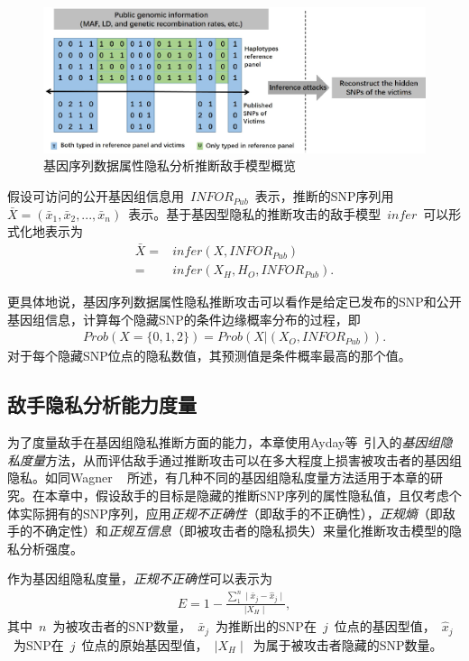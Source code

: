 \begin{figure}[htbp]
	\centering
	\includegraphics[width = 0.95\linewidth]{./figures/Fig2-adversary-model.eps}
	\caption{基因序列数据属性隐私分析推断敌手模型概览}
	\label{fig:adversary-model}
\end{figure}

假设可访问的公开基因组信息用~${INFOR}_{Pub}$~表示，推断的SNP序列用~$\bar{X}=(\bar{x}_1, \bar{x}_2,...,\bar{x}_n)$~表示。基于基因型隐私的推断攻击的敌手模型~$infer$~可以形式化地表示为
\begin{align}\label{eq:adversary-model}
\bar{X} =& infer(X,{INFOR}_{Pub})  \nonumber \\
= & infer(X_H,H_O,{INFOR}_{Pub}).
\end{align}

更具体地说，基因序列数据属性隐私推断攻击可以看作是给定已发布的SNP和公开基因组信息，计算每个隐藏SNP的条件边缘概率分布的过程，即
\begin{align}\label{eq:adversary-model-prob}
Prob(X=\{0,1,2\})=Prob(X|(X_O,{INFOR}_{Pub})).
\end{align}
对于每个隐藏SNP位点的隐私数值，其预测值是条件概率最高的那个值。

\subsection{敌手隐私分析能力度量}


为了度量敌手在基因组隐私推断方面的能力，本章使用Ayday等~\cite{ayday2013personal}引入的\textit{基因组隐私度量}方法，从而评估敌手通过推断攻击可以在多大程度上损害被攻击者的基因组隐私。如同Wagner
~\cite{wagner2017evaluating}
所述，有几种不同的基因组隐私度量方法适用于本章的研究。在本章中，假设敌手的目标是隐藏的推断SNP序列的属性隐私值，且仅考虑个体实际拥有的SNP序列，应用\textit{正规不正确性}（即敌手的不正确性），\textit{正规熵}（即敌手的不确定性）和\textit{正规互信息}（即被攻击者的隐私损失）来量化推断攻击模型的隐私分析强度。

作为基因组隐私度量，\textit{正规不正确性}可以表示为
\begin{align}\label{eq:metric-correctness}
E=1- \frac{\sum_1^n \mid \bar{x}_j - \hat{x}_j \mid}  {\mid X_H \mid},
\end{align}
其中~$n$~为被攻击者的SNP数量，~$\bar{x}_j$~为推断出的SNP在~$j$~位点的基因型值，~$\hat{x}_j$~为SNP在~$j$~位点的原始基因型值，~$\mid X_H \mid$~为属于被攻击者隐藏的SNP数量。

